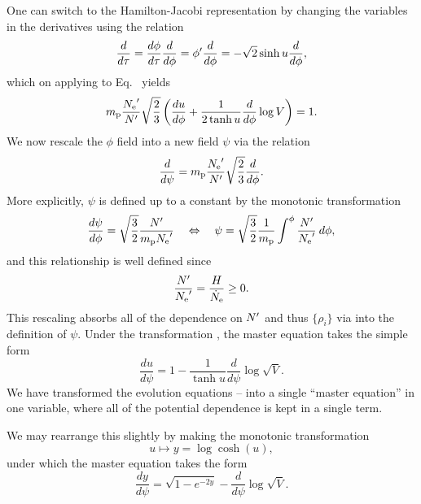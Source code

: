 One can switch to the Hamilton-Jacobi representation by changing the
variables in the derivatives using the relation 
%
\begin{equation}
  \frac{d }{d \tau}
  =
  \frac{d \phi}{d \tau}\frac{d }{d \phi}
  =
  {{\phi}^\prime}\frac{d }{d \phi}
  =
  -\sqrt{2}\sinh u \frac{d }{d \phi},
  \label{eqn:tautrans}
\end{equation}
%
which on applying to Eq.\  yields
%
\begin{equation}
  m_{\mathrm{p}}\frac{{{N_\mathrm{e}}^\prime}}{{{N}^\prime}} \sqrt{\frac{2}{3}}
  \left(\frac{du}{d\phi} 
  + \frac{1}{2\tanh u} \frac{d}{d\phi}\log V\right) 
  = 
  1.
  \label{eqn:master_phi}
\end{equation}
%
We now  rescale the $\phi$ field into a new field $\psi$ via the
relation
%
\begin{equation}
  \frac{d}{d\psi} 
  = 
  m_{\mathrm{p}}\frac{{{N_\mathrm{e}}^\prime}}{{{N}^\prime}}\sqrt{\frac{2}{3}}\frac{d}{d\phi}.
\end{equation}
%
More explicitly, $\psi$ is defined up to a constant by the monotonic
transformation
%
\begin{equation}
  \frac{d\psi}{d\phi} 
  = 
  \sqrt{\frac{3}{2}}\frac{{{N}^\prime}}{m_{\mathrm{p}}{{N_\mathrm{e}}^\prime}} 
  \quad
  \Leftrightarrow\quad \psi 
  = 
  \sqrt{\frac{3}{2}}\frac{1}{m_{\mathrm{p}}}\int^\phi 
  \frac{{{N}^\prime}}{{{N_\mathrm{e}}^\prime}}\:d\phi,
  \label{eqn:psi_by_phi}
\end{equation}
%
and this relationship is well defined since 
%
\begin{equation}
	\frac{{{N}^\prime}}{{{N_\mathrm{e}}^\prime}} = \frac{H}{\dot{N}_\mathrm{e}} \ge 0.
\end{equation}
%
This rescaling absorbs all of the dependence on ${{N}^\prime}$ and thus
$\{\rho_i\}$ via  into the definition of
$\psi$. Under the transformation , the master
equation  takes the simple form
%
\begin{equation}
  \frac{du}{d\psi}  
  = 
  1-\frac{1}{\tanh u} \frac{d}{d\psi}\log \sqrt V.
\end{equation}
%
We have transformed the evolution equations
-- into a single
``master equation'' in one variable, where all of the potential
dependence is kept in a single term.

We may rearrange this slightly by making the monotonic transformation
%
\begin{equation}
  u\mapsto y = \log\cosh(u), 
  \label{eqn:y_def}
\end{equation}
%
under which the master equation takes the form
%
\begin{equation}
  \frac{dy}{d\psi} = \sqrt{1-e^{-2y}} - \frac{d}{d\psi}\log \sqrt V.
  \label{eqn:master_eq}
\end{equation}
%

